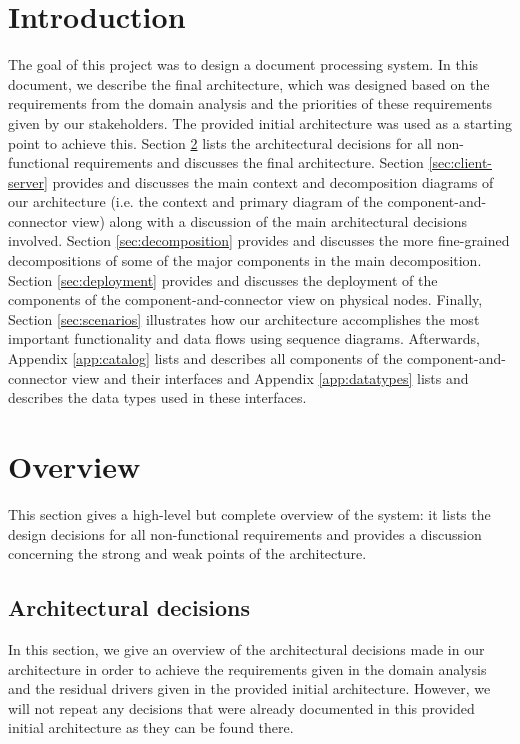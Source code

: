 \documentclass[a4paper,10pt]{article}
\begin{document}


\tableofcontents
\newpage

\section{Introduction}\label{sec:introduction}
The goal of this project was to design a document processing system. In this document, we describe the final architecture, which was designed based on the requirements from the domain analysis and the priorities of these requirements given by our stakeholders. The provided initial architecture was used as a starting point to achieve this.
Section \ref{sec:overview} lists the architectural decisions for all non-functional requirements and discusses the final architecture.
Section \ref{sec:client-server} provides and discusses the main context and decomposition diagrams of our architecture (i.e. the context and primary diagram of the component-and-connector view) along with a discussion of the main architectural decisions involved.
Section \ref{sec:decomposition} provides and discusses the more fine-grained decompositions of some of the major components in the main decomposition.
Section \ref{sec:deployment} provides and discusses the deployment of the components of the component-and-connector view on physical nodes.
Finally, Section \ref{sec:scenarios} illustrates how our architecture accomplishes the most important functionality and data flows using sequence diagrams.
Afterwards, Appendix \ref*{app:catalog} lists and describes all components of the component-and-connector view and their interfaces and Appendix \ref*{app:datatypes} lists and describes the data types used in these interfaces.
\section{Overview}\label{sec:overview}
This section gives a high-level but complete overview of the system: it lists the design decisions for all non-functional requirements and provides a discussion concerning the strong and weak points of the architecture.
\subsection{Architectural decisions}
In this section, we give an overview of the architectural decisions made in our architecture in order to achieve the requirements given in the domain analysis and the residual drivers given in the provided initial architecture. However, we will not repeat any decisions that were already documented in this provided initial architecture as they can be found there.
\end{document}
